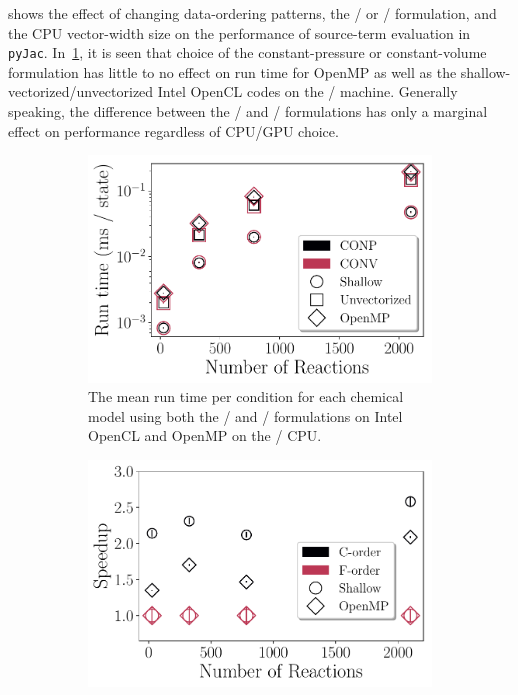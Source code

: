 \documentclass[12pt,number,sort&compress,preprint]{elsarticle}
\begin{document}
 shows the effect of changing data-ordering patterns, the \conp/ or \conv/ formulation, and the CPU vector-width size on the performance of source-term evaluation in \texttt{pyJac}.
In~\cref{F:source_conpvsconv}, it is seen that choice of the constant-pressure or constant-volume formulation has little to no effect on run time for OpenMP as well as the shallow-vectorized\slash unvectorized Intel OpenCL codes on the \avx/ machine.
Generally speaking, the difference between the \conp/ and \conv/ formulations has only a marginal effect on performance regardless of CPU\slash GPU choice.

\begin{figure}[htbp]
   \centering
  \begin{subfigure}[t]{0.48\linewidth}
      \includegraphics[width=\textwidth]{source_conpvsconv.pdf}
      \caption{The mean run time per condition for each chemical model using both the \conp/ and \conv/ formulations on Intel OpenCL and OpenMP on the \avx/ CPU.}
      \label{F:source_conpvsconv}
  \end{subfigure}
  \hfill
  \begin{subfigure}[t]{0.48\linewidth}
      \includegraphics[width=\textwidth]{source_cvsf.pdf}

\end{subfigure}
\end{figure}
\end{document}
